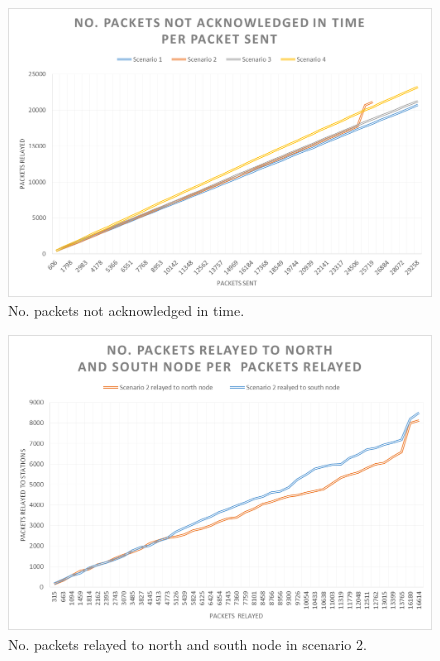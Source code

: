 \begin{figure}[H]
	\centering
	\includegraphics[width=1\linewidth]{results/NoPacketsNotACKInTime}
	\caption{No. packets not acknowledged in time.}
	\label{fig:nopacketsnotackintime}
\end{figure}

\begin{figure}[H]
	\centering
	\includegraphics[width=1\linewidth]{results/NoPacketsRelayedScenario2}
	\caption{No. packets relayed to north and south node in scenario 2.}
	\label{fig:nopacketsrelayedscenario2}
\end{figure}

